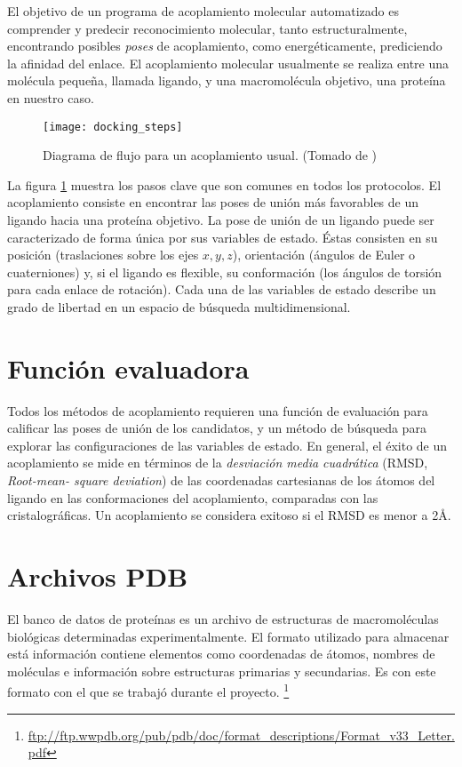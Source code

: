 El objetivo de un programa de acoplamiento molecular automatizado es comprender
y predecir reconocimiento molecular, tanto estructuralmente, encontrando
posibles \textit{poses} de acoplamiento, como energéticamente, prediciendo la
afinidad del enlace. El acoplamiento molecular usualmente se realiza entre una
molécula pequeña, llamada ligando, y una macromolécula objetivo, una proteína en
nuestro caso.

\begin{figure}[H]
  \texttt{[image: docking\_steps]}
  \caption{Diagrama de flujo para un acoplamiento usual.  (Tomado de
    \cite{kukol})}
  \label{fig:docking_flowchart}
\end{figure}

La figura \ref{fig:docking_flowchart} muestra los pasos clave que son
comunes en todos los protocolos. El acoplamiento consiste en encontrar
las poses de unión más favorables de un ligando hacia una proteína
objetivo. La pose de unión de un ligando puede ser caracterizado de
forma única por sus variables de estado. Éstas consisten en su
posición (traslaciones sobre los ejes $x, y, z$), orientación (ángulos
de Euler o cuaterniones) y, si el ligando es flexible, su conformación
(los ángulos de torsión para cada enlace de rotación). Cada una de las
variables de estado describe un grado de libertad en un espacio de
búsqueda multidimensional.

\section{Función evaluadora}
Todos los métodos de acoplamiento requieren una función de evaluación
para calificar las poses de unión de los candidatos, y un método de
búsqueda para explorar las configuraciones de las variables de
estado. En general, el éxito de un acoplamiento se mide en términos de
la \textit{desviación media cuadrática} (RMSD, \textit{Root-mean-
square deviation}) de las coordenadas cartesianas de los átomos del
ligando en las conformaciones del acoplamiento, comparadas con las
cristalográficas. Un acoplamiento se considera exitoso si el RMSD es
menor a 2\AA.

\section{Archivos PDB}
El banco de datos de proteínas es un archivo de estructuras de
macromoléculas biológicas determinadas experimentalmente. El formato
utilizado para almacenar está información contiene elementos como
coordenadas de átomos, nombres de moléculas e información sobre
estructuras primarias y secundarias. Es con este formato con el que se
trabajó durante el proyecto.
\footnote{\url{ftp://ftp.wwpdb.org/pub/pdb/doc/format_descriptions/Format_v33_Letter.pdf}}

